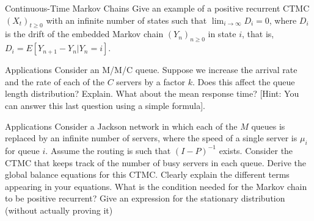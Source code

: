 \begin{problem}{Continuous-Time Markov Chains}
Give an example of a positive recurrent CTMC $(X_t)_{t\geq 0}$ with an infinite number of states such that $\lim_{i\rightarrow\infty} D_i = 0$, where $D_i$ is the drift of the embedded Markov chain $(Y_n)_{n\geq 0}$ in state $i$, that is, $D_i = E[Y_{n+1} - Y_n|Y_n = i]$.
\end{problem}

\begin{problem}{Applications}
Consider an M/M/C queue. Suppose we increase the arrival rate and the rate of each of the $C$ servers by a factor $k$. Does this affect the queue length distribution? Explain. What about the mean response time? [Hint: You can answer this last question using a simple formula].
\end{problem}

\begin{problem}{Applications}
  Consider a Jackson network in which each of the $M$ queues is replaced by an infinite number of servers, where the speed of a single server is $\mu_i$ for queue $i$. Assume the routing is such that $(I - P )^{-1}$ exists. Consider the CTMC that keeps track of the number of busy servers in each queue. Derive the global balance equations for this CTMC. Clearly explain the different terms appearing in your equations. What is the condition needed for the Markov chain to be positive recurrent? Give an expression for the stationary distribution (without actually proving it)
\end{problem}
